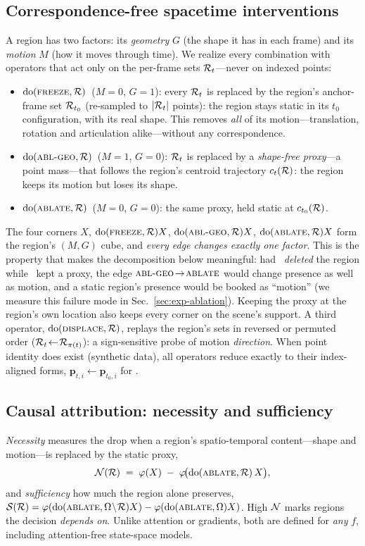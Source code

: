 \subsection{Correspondence-free spacetime interventions}
\label{sec:method-interventions}
A region has two factors: its \emph{geometry} $G$ (the shape it has in each frame) and its \emph{motion} $M$ (how it moves through time). We realize every combination with operators that act only on the per-frame sets $\mathcal{R}_t$---never on indexed points:
\begin{itemize}[leftmargin=1.2em,itemsep=1pt,topsep=2pt]
\item $\mathrm{do}(\textsc{freeze},\mathcal{R})$ \,($M{=}0$, $G{=}1$): every $\mathcal{R}_t$ is replaced by the region's anchor-frame set $\mathcal{R}_{t_0}$ (re-sampled to $|\mathcal{R}_t|$ points): the region stays static in its $t_0$ configuration, with its real shape. This removes \emph{all} of its motion---translation, rotation and articulation alike---without any correspondence.
\item $\mathrm{do}(\textsc{abl-geo},\mathcal{R})$ \,($M{=}1$, $G{=}0$): $\mathcal{R}_t$ is replaced by a \emph{shape-free proxy}---a point mass---that follows the region's centroid trajectory $c_t(\mathcal{R})$: the region keeps its motion but loses its shape.
\item $\mathrm{do}(\textsc{ablate},\mathcal{R})$ \,($M{=}0$, $G{=}0$): the same proxy, held static at $c_{t_0}(\mathcal{R})$.
\end{itemize}
The four corners $X$, $\mathrm{do}(\textsc{freeze},\mathcal{R})X$, $\mathrm{do}(\textsc{abl-geo},\mathcal{R})X$, $\mathrm{do}(\textsc{ablate},\mathcal{R})X$ form the region's $(M,G)$ cube, and \emph{every edge changes exactly one factor}. This is the property that makes the decomposition below meaningful: had \abl\ \emph{deleted} the region while \ablgeo\ kept a proxy, the edge $\textsc{abl-geo}\!\to\!\textsc{ablate}$ would change presence as well as motion, and a static region's presence would be booked as ``motion'' (we measure this failure mode in Sec.~\ref{sec:exp-ablation}). Keeping the proxy at the region's own location also keeps every corner on the scene's support. A third operator, $\mathrm{do}(\textsc{displace},\mathcal{R})$, replays the region's sets in reversed or permuted order ($\mathcal{R}_t\!\leftarrow\!\mathcal{R}_{\pi(t)}$): a sign-sensitive probe of motion \emph{direction}. When point identity does exist (synthetic data), all operators reduce exactly to their index-aligned forms, \eg $\mathbf p_{t,i}\!\leftarrow\!\mathbf p_{t_0,i}$ for \frz.

\subsection{Causal attribution: necessity and sufficiency}
\label{sec:method-causal}
\emph{Necessity} measures the drop when a region's spatio-temporal content---shape and motion---is replaced by the static proxy,
\begin{equation}
\mathcal{N}(\mathcal{R})\;=\;\varphi(X)\;-\;\varphi\!\big(\mathrm{do}(\textsc{ablate},\mathcal{R})\,X\big),
\label{eq:necessity}
\end{equation}
and \emph{sufficiency} how much the region alone preserves, $\mathcal{S}(\mathcal{R})=\varphi(\mathrm{do}(\textsc{ablate},\Omega\!\setminus\!\mathcal{R})X)-\varphi(\mathrm{do}(\textsc{ablate},\Omega)X)$. High $\mathcal{N}$ marks regions the decision \emph{depends on}. Unlike attention or gradients, both are defined for \emph{any} $f$, including attention-free state-space models.


